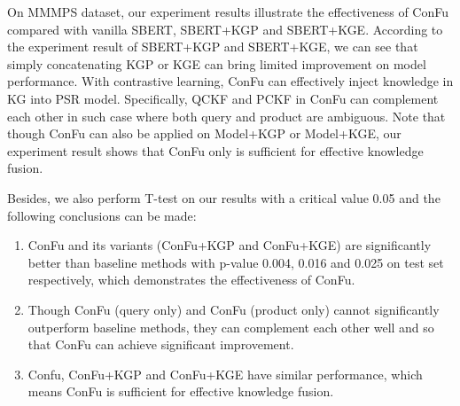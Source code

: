 On MMMPS dataset, our experiment results illustrate the effectiveness of ConFu compared with vanilla SBERT, SBERT+KGP and SBERT+KGE. According to the experiment result of SBERT+KGP and SBERT+KGE, we can see that simply concatenating KGP or KGE can bring limited improvement on model performance. With contrastive learning, ConFu can effectively inject knowledge in KG into PSR model. Specifically, QCKF and PCKF in ConFu can complement each other in such case where both query and product are ambiguous. Note that though ConFu can also be applied on Model+KGP or Model+KGE, our experiment result shows that ConFu only is sufficient for effective knowledge fusion.

Besides, we also perform T-test on our results with a critical value 0.05 and the following conclusions can be made:

\begin{enumerate}
  \item ConFu and its variants (ConFu+KGP and ConFu+KGE) are significantly better than baseline methods with p-value 0.004, 0.016 and 0.025 on test set respectively, which demonstrates the effectiveness of ConFu.
  \item Though ConFu (query only) and ConFu (product only) cannot significantly outperform baseline methods, they can complement each other well and so that ConFu can achieve significant improvement.
  \item Confu, ConFu+KGP and ConFu+KGE have similar performance, which means ConFu is sufficient for effective knowledge fusion.
\end{enumerate}



